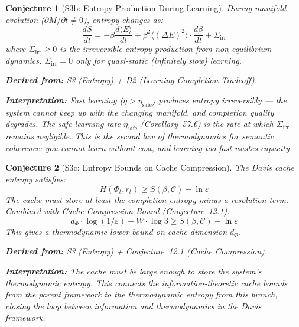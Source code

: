 \documentclass[11pt,letterpaper]{article}
\newtheorem{conjecture}{Conjecture}[section]
\begin{document}
\begin{conjecture}[S3b: Entropy Production During 
Learning]\label{conj:entropy_prod}
During manifold evolution ($\partial M / \partial t \neq 0$), entropy 
changes as:
\begin{equation}
    \frac{dS}{dt} = -\beta \frac{d\langle E \rangle}{dt} 
    + \beta^2 \langle (\Delta E)^2 \rangle \cdot \frac{d\beta}{dt} 
    + \Sigma_{\mathrm{irr}}
\end{equation}
where $\Sigma_{\mathrm{irr}} \geq 0$ is the irreversible entropy 
production from non-equilibrium dynamics. $\Sigma_{\mathrm{irr}} = 0$ only 
for quasi-static (infinitely slow) learning.

\textbf{Derived from:} S3 (Entropy) + D2 (Learning-Completion Tradeoff).

\textbf{Interpretation:} Fast learning ($\eta > \eta_{\mathrm{safe}}$) 
produces entropy irreversibly --- the system cannot keep up with the 
changing manifold, and completion quality degrades. The safe learning rate 
$\eta_{\mathrm{safe}}$ (Corollary~57.6) is the rate at which 
$\Sigma_{\mathrm{irr}}$ remains negligible. This is the second law of 
thermodynamics for semantic coherence: you cannot learn without cost, and 
learning too fast wastes capacity.
\end{conjecture}

\begin{conjecture}[S3c: Entropy Bounds on Cache 
Compression]\label{conj:entropy_cache}
The Davis cache entropy satisfies:
\begin{equation}
    H(\Phi_t, r_t) \geq S(\beta, \mathcal{C}) - \ln \varepsilon
\end{equation}
The cache must store at least the completion entropy minus a resolution 
term. Combined with Cache Compression Bound (Conjecture~12.1):
\begin{equation}
    d_\Phi \cdot \log(1/\varepsilon) + W \cdot \log 3 
    \geq S(\beta, \mathcal{C}) - \ln \varepsilon
\end{equation}
This gives a thermodynamic lower bound on cache dimension $d_\Phi$.

\textbf{Derived from:} S3 (Entropy) + Conjecture~12.1 
(Cache Compression).

\textbf{Interpretation:} The cache must be large enough to store the 
system's thermodynamic entropy. This connects the information-theoretic 
cache bounds from the parent framework to the thermodynamic entropy from 
this branch, closing the loop between information and thermodynamics in 
the Davis framework.
\end{conjecture}
\end{document}
